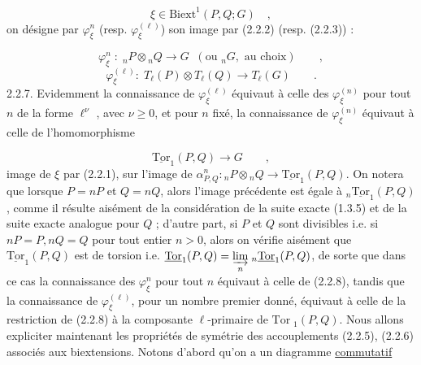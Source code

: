 \begin{equation}\tag{2.2.4}
\xi \in \mathrm{Biext}^1(P,Q;G) \quad ,
\end{equation}
on désigne par $\varphi_\xi^n$ (resp. $\varphi_\xi^{(\ell)}$) son image par (2.2.2) (resp. (2.2.3)) :

\begin{equation}\tag{2.2.5}
\varphi_\xi^n \; : \; {}_nP \otimes {}_nQ \longrightarrow G \;\; (\text{ou } {}_nG, \text{ au choix}) \qquad ,
\end{equation}
\begin{equation}\tag{2.2.6}
\varphi_\xi^{(\ell)} : \; T_\ell(P) \otimes T_\ell(Q) \longrightarrow T_\ell(G) \qquad .
\end{equation}
2.2.7.  Evidemment la connaissance de $\varphi_\xi^{(\ell)}$ équivaut à celle des $\varphi_\xi^{(n)}$ pour tout $n$ de la forme $\ell^\nu$ , avec $\nu \geq 0$, et pour $n$ fixé, la connaissance de $\varphi_\xi^{(n)}$ équivaut à celle de l'homomorphisme

\begin{equation}\tag{2.2.8}
\underline{\mathrm{Tor}}_1(P,Q) \longrightarrow G \qquad ,
\end{equation}
image de $\xi$ par (2.2.1), sur l'image de $\alpha^n_{P,Q} : {}_nP \otimes {}_nQ \longrightarrow \underline{\mathrm{Tor}}_1(P,Q)$. On notera que lorsque $P=nP$ et $Q=nQ$, alors l'image précédente est égale à ${}_n\underline{\mathrm{Tor}}_1(P,Q)$, comme il résulte aisément de la considération de la suite exacte (1.3.5) et de la suite exacte analogue pour $Q$ ; d'autre part, si $P$ et $Q$ sont divisibles i.e. si $nP=P,nQ=Q$ pour tout entier $n > 0$, alors on vérifie aisément que $\underline{\mathrm{Tor}}_1(P,Q)$ est de torsion i.e. $\underline{\mathrm{Tor}}_1(P,Q) = \underset{n}{\varinjlim}\; {}_n\underline{\mathrm{Tor}}_1(P,Q)$, de sorte que dans ce cas la connaissance des $\varphi_\xi^n$ pour tout $n$ équivaut à celle de (2.2.8), tandis que la connaissance de $\varphi_\xi^{(\ell)}$, pour un nombre premier donné, équivaut à celle de la restriction de (2.2.8) à la composante $\ell$-primaire de $\mathrm{Tor}\; {}_1(P,Q)$. Nous allons expliciter maintenant les propriétés de symétrie des accouplements (2.2.5), (2.2.6) associés aux biextensions. Notons d'abord qu'on a un diagramme \underline{commutatif}

